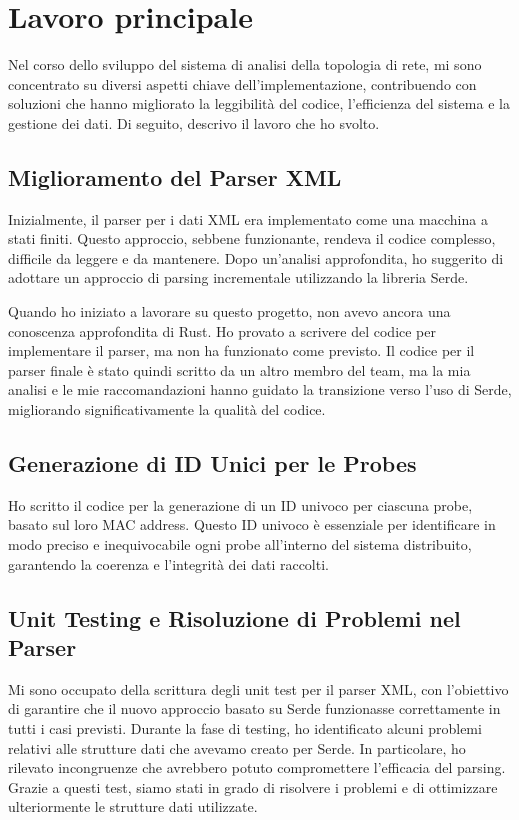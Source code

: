 \documentclass[target=bach,aauheader=,style=]{thud}
\begin{document}
\chapter{Lavoro principale}
Nel corso dello sviluppo del sistema di analisi della topologia di rete, mi sono concentrato su diversi aspetti chiave dell'implementazione, contribuendo con soluzioni che hanno migliorato la leggibilità del codice, l'efficienza del sistema e la gestione dei dati. Di seguito, descrivo il lavoro che ho svolto.

\section{Miglioramento del Parser XML}
Inizialmente, il parser per i dati XML era implementato come una macchina a stati finiti. Questo approccio, sebbene funzionante, rendeva il codice complesso, difficile da leggere e da mantenere. Dopo un'analisi approfondita, ho suggerito di adottare un approccio di parsing incrementale utilizzando la libreria Serde.

Quando ho iniziato a lavorare su questo progetto, non avevo ancora una conoscenza approfondita di Rust. Ho provato a scrivere del codice per implementare il parser, ma non ha funzionato come previsto. Il codice per il parser finale è stato quindi scritto da un altro membro del team, ma la mia analisi e le mie raccomandazioni hanno guidato la transizione verso l'uso di Serde, migliorando significativamente la qualità del codice.

\section{Generazione di ID Unici per le Probes}
Ho scritto il codice per la generazione di un ID univoco per ciascuna probe, basato sul loro MAC address. Questo ID univoco è essenziale per identificare in modo preciso e inequivocabile ogni probe all'interno del sistema distribuito, garantendo la coerenza e l'integrità dei dati raccolti.

\section{Unit Testing e Risoluzione di Problemi nel Parser}
Mi sono occupato della scrittura degli unit test per il parser XML, con l'obiettivo di garantire che il nuovo approccio basato su Serde funzionasse correttamente in tutti i casi previsti. Durante la fase di testing, ho identificato alcuni problemi relativi alle strutture dati che avevamo creato per Serde. In particolare, ho rilevato incongruenze che avrebbero potuto compromettere l'efficacia del parsing. Grazie a questi test, siamo stati in grado di risolvere i problemi e di ottimizzare ulteriormente le strutture dati utilizzate.
\end{document}
